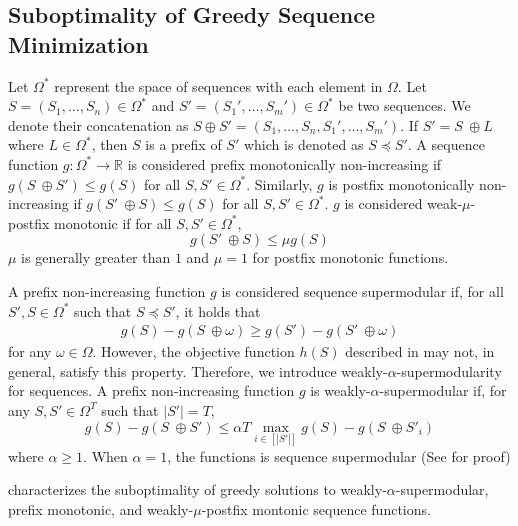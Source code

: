 \documentclass{article} %
\begin{document}
\subsection{Suboptimality of Greedy Sequence Minimization}

Let $\Omega^*$ represent the space of sequences with each element in $\Omega$. Let $S = (S_1, \dots, S_n) \in \Omega^*$ and $S' = (S_1', \dots, S_m') \in \Omega^*$ be two sequences. We denote their concatenation as $S \oplus S' = (S_1, \dots, S_n, S_1', \dots, S_m')$. If $S' = S \ \oplus L$ where $L \in \Omega^*$, then $S$ is a prefix of $S'$ which is denoted as $S \preceq S'$. A sequence function $g: \Omega^* \to \mathbb{R}$ is considered prefix monotonically non-increasing if $g(S \ \oplus S') \leq g(S)$ for all $S, S' \in \Omega^*$. Similarly, $g$ is postfix monotonically non-increasing if $g(S' \ \oplus S) \leq g(S)$ for all $S, S' \in \Omega^*$. $g$ is considered weak-$\mu$-postfix monotonic if for all $S, S' \in \Omega^*$, 
\begin{equation*}
    g(S' \ \oplus S) \leq \mu g(S)
\end{equation*}
$\mu$ is generally greater than $1$ and $\mu = 1$ for postfix monotonic functions.

A prefix non-increasing function $g$ is considered sequence supermodular if, for all $S', S \in \Omega^*$ such that $S \preceq S'$, it holds that
\begin{align*}
    g(S) - g(S \ \oplus \omega ) \geq g(S') - g(S' \ \oplus \omega )
\end{align*}
for any $\omega \in \Omega$. However, the objective function $h(S)$ described in  may not, in general, satisfy this property. Therefore, we introduce weakly-$\alpha$-supermodularity for sequences. A prefix non-increasing function $g$ is weakly-$\alpha$-supermodular if, for any $S, S' \in \Omega^T$ such that $|S'| = T$, 
\begin{equation*}
     g(S) - g(S\ \oplus S') \leq \alpha T \max_{i \in [|S'|]} g(S) - g(S \ \oplus S'_i)
\end{equation*}
where $\alpha \geq 1$. When $\alpha = 1$, the functions is sequence supermodular (See  for proof)



 characterizes the suboptimality of greedy solutions to weakly-$\alpha$-supermodular, prefix monotonic, and weakly-$\mu$-postfix montonic sequence functions. 
\end{document}
